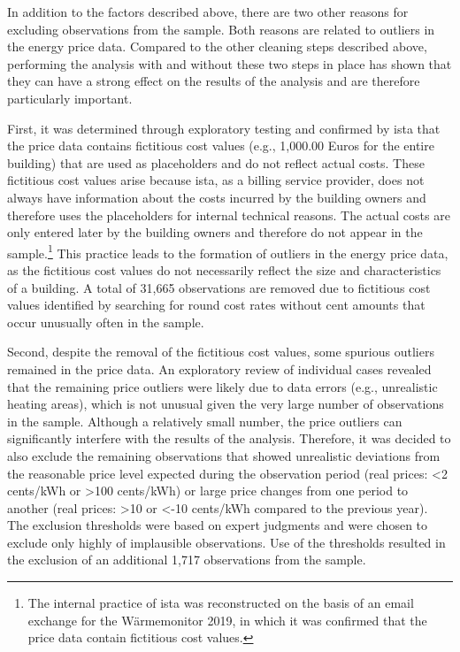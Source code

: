 \documentclass[12pt,twoside]{reedthesis}
\begin{document}
In addition to the factors described above, there are two other reasons for excluding observations from the sample. Both reasons are related to outliers in the energy price data. Compared to the other cleaning steps described above, performing the analysis with and without these two steps in place has shown that they can have a strong effect on the results of the analysis and are therefore particularly important.

First, it was determined through exploratory testing and confirmed by ista that the price data contains fictitious cost values (e.g., 1,000.00 Euros for the entire building) that are used as placeholders and do not reflect actual costs. These fictitious cost values arise because ista, as a billing service provider, does not always have information about the costs incurred by the building owners and therefore uses the placeholders for internal technical reasons. The actual costs are only entered later by the building owners and therefore do not appear in the sample.\footnote{The internal practice of ista was reconstructed on the basis of an email exchange for the Wärmemonitor 2019, in which it was confirmed that the price data contain fictitious cost values.} This practice leads to the formation of outliers in the energy price data, as the fictitious cost values do not necessarily reflect the size and characteristics of a building. A total of 31,665 observations are removed due to fictitious cost values identified by searching for round cost rates without cent amounts that occur unusually often in the sample.

Second, despite the removal of the fictitious cost values, some spurious outliers remained in the price data. An exploratory review of individual cases revealed that the remaining price outliers were likely due to data errors (e.g., unrealistic heating areas), which is not unusual given the very large number of observations in the sample. Although a relatively small number, the price outliers can significantly interfere with the results of the analysis. Therefore, it was decided to also exclude the remaining observations that showed unrealistic deviations from the reasonable price level expected during the observation period (real prices: \textless2 cents/kWh or \textgreater100 cents/kWh) or large price changes from one period to another (real prices: \textgreater10 or \textless-10 cents/kWh compared to the previous year). The exclusion thresholds were based on expert judgments and were chosen to exclude only highly of implausible observations. Use of the thresholds resulted in the exclusion of an additional 1,717 observations from the sample.
\end{document}
